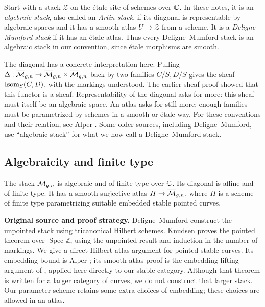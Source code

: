 \begin{Def}
Start with a stack $\mathcal Z$ on the \'etale site of schemes over
$\mathbb C$. In these notes, it is an \emph{algebraic stack}, also called
an \emph{Artin stack}, if its diagonal is representable by algebraic
spaces and it has a smooth atlas $U\to\mathcal Z$ from a scheme.
It is a \emph{Deligne--Mumford stack} if it has an \'etale atlas.
Thus every Deligne--Mumford stack is an algebraic stack in our
convention, since \'etale morphisms are smooth.
\end{Def}

The diagonal has a concrete interpretation here. Pulling
$\Delta:\overline{\mathcal M}_{g,n}\to\overline{\mathcal M}_{g,n}\times\overline{\mathcal M}_{g,n}$ back by two families $C/S,D/S$
gives the sheaf $\operatorname{Isom}_S(C,D)$, with the markings understood.
The earlier sheaf proof showed that this functor is a sheaf.
Representability of the diagonal asks for more: this sheaf must
itself be an algebraic space. An atlas asks for still more: enough
families must be parametrized by schemes in a smooth or \'etale way.
For these conventions and their relation, see Alper
\cite[Definitions 4.1.3--4.1.6 and Theorem 4.2.1, pp.~105--106,
118--119]{Alper}. Some older sources, including Deligne--Mumford,
use ``algebraic stack'' for what we now call a Deligne--Mumford stack.

\subsection{Algebraicity and finite type}

\begin{Prop}\label{prop:curves-algebraic}
The stack $\overline{\mathcal M}_{g,n}$ is algebraic and of finite type over $\mathbb C$.
Its diagonal is affine and of finite type. It has a smooth
surjective atlas $H\to\overline{\mathcal M}_{g,n}$, where $H$ is a scheme of finite
type parametrizing suitable embedded stable pointed curves.
\end{Prop}

\noindent\textbf{Original source and proof strategy.}
Deligne--Mumford \cite[Section 1, pp.~77--78, and Proposition (5.1),
p.~104]{DM} construct the unpointed stack using tricanonical Hilbert
schemes. Knudsen \cite[Theorem 2.7, p.~179]{Knudsen} proves the
pointed theorem over $\operatorname{Spec}\mathbb Z$, using the
unpointed result and induction in the number of markings.
We give a direct Hilbert-atlas argument for pointed stable curves.
Its embedding bound is Alper
\cite[Proposition 6.3.23, p.~231]{Alper}; its smooth-atlas proof is
the embedding-lifting argument of
\cite[Theorem 6.4.6, pp.~238--240]{Alper}, applied here directly
 to our stable category. Although that theorem is written for a
larger category of curves, we do not construct that larger stack.
Our parameter scheme retains some extra choices of embedding;
these choices are allowed in an atlas.

